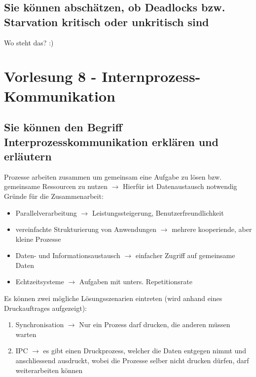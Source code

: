 \documentclass{report}
\theoremstyle{definition}
\theoremstyle{example}
\begin{document}
\section{Sie können abschätzen, ob Deadlocks bzw. Starvation kritisch oder unkritisch sind}
Wo steht das? :) 

\chapter{Vorlesung 8 - Internprozess-Kommunikation}

\section{Sie können den Begriff Interprozesskommunikation erklären und erläutern}
Prozesse arbeiten zusammen um gemeinsam eine Aufgabe zu lösen bzw. gemeinsame Ressourcen zu nutzen $\rightarrow$ Hierfür ist Datenaustausch notwendig\\
Gründe für die Zusammenarbeit:
\begin{itemize}
	\item Parallelverarbeitung $\rightarrow$ Leistungssteigerung, Benutzerfreundlichkeit
	\item vereinfachte Strukturierung von Anwendungen $\rightarrow$ mehrere kooperiende, aber kleine Prozesse
	\item Daten- und Informationsaustausch $\rightarrow$ einfacher Zugriff auf gemeinsame Daten
	\item Echtzeitsysteme $\rightarrow$ Aufgaben mit unters. Repetitionsrate
\end{itemize}

Es können zwei mögliche Lösungsszenarien eintreten (wird anhand eines Druckauftrages aufgezeigt):
\begin{enumerate}
	\item Synchronisation $\rightarrow$ Nur ein Prozess darf drucken, die anderen müssen warten
	\item IPC $\rightarrow$ es gibt einen Druckprozess, welcher die Daten entgegen nimmt und anschliessend ausdruckt, wobei die Prozesse selber nicht drucken dürfen, darf weiterarbeiten können
\end{enumerate}
\end{document}

